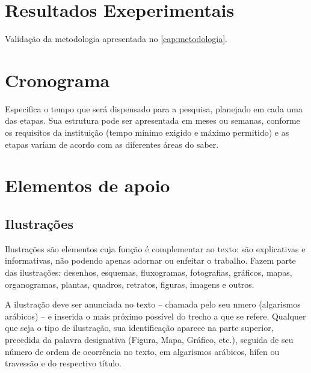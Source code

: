 \documentclass[12pt,oneside,a4paper,chapter=TITLE,section=TITLE,sumario=tradicional]{abntex2}
\begin{document}
\chapter{Resultados Exeperimentais}
\label{cap:resultados}

Validação da metodologia apresentada no \autoref{cap:metodologia}.

\chapter{Cronograma}
\label{cap:cronograma}

Especifica o tempo que será dispensado para a pesquisa, planejado em cada uma 
das etapas. Sua estrutura pode ser apresentada em meses ou semanas, conforme os 
requisitos da instituição (tempo mínimo exigido e máximo permitido) e as etapas 
variam de acordo com as diferentes áreas do saber.

\chapter{Elementos de apoio}
\label{cap:apoio}

\section{Ilustrações}
\label{cap:ilustracoes}

Ilustrações são elementos cuja função é complementar ao texto: são explicativas 
e informativas, não podendo apenas adornar ou enfeitar o trabalho. Fazem parte 
das ilustrações: desenhos, esquemas, fluxogramas, fotografias, gráficos, mapas, 
organogramas, plantas, quadros, retratos, figuras, imagens e outros.

A ilustração deve ser anunciada no texto – chamada pelo seu nmero (algarismos 
arábicos) – e inserida o mais próximo possível do trecho a que se refere.
Qualquer que seja o tipo de ilustração, sua identificação aparece na parte 
superior, precedida da palavra designativa (Figura, Mapa, Gráfico, etc.), 
seguida de seu número de ordem de ocorrência no texto, em algarismos arábicos, 
hífen ou travessão e do respectivo título.
\end{document}
